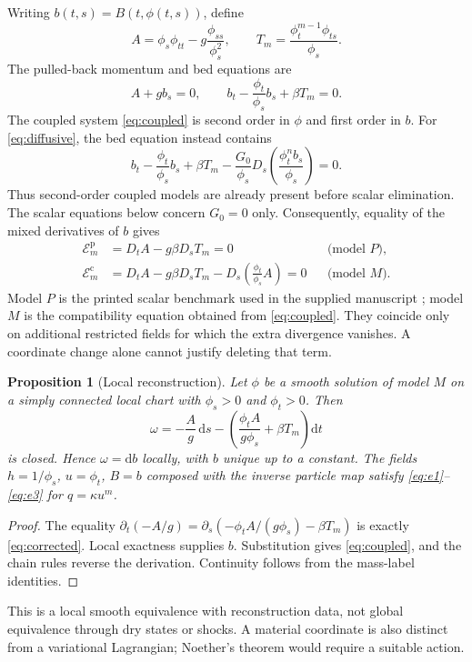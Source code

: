 \documentclass[11pt,a4paper,oneside]{report}
\numberwithin{equation}{chapter}
\newtheorem{proposition}[theorem]{Proposition}
\newcommand{\E}{\mathcal E}
\newcommand{\dd}{\mathrm d}
\begin{document}
Writing $b(t,s)=B(t,\phi(t,s))$, define
\begin{equation}
A=\phi_s\phi_{tt}-g\frac{\phi_{ss}}{\phi_s^2},\qquad
T_m=\frac{\phi_t^{m-1}\phi_{ts}}{\phi_s}.
\end{equation}
The pulled-back momentum and bed equations are
\begin{equation}\label{eq:coupled}
A+gb_s=0,\qquad b_t-\frac{\phi_t}{\phi_s}b_s+\beta T_m=0.
\end{equation}
The coupled system \eqref{eq:coupled} is second order in $\phi$ and first order in $b$. For \eqref{eq:diffusive}, the bed equation instead contains
\begin{equation}\label{eq:diffusive-material}
b_t-\frac{\phi_t}{\phi_s}b_s+\beta T_m
-\frac{G_0}{\phi_s}D_s\!\left(\frac{\phi_t^n b_s}{\phi_s}\right)=0.
\end{equation}
Thus second-order coupled models are already present before scalar elimination. The scalar equations below concern $G_0=0$ only.
Consequently, equality of the mixed derivatives of $b$ gives
\begin{align}
\E_m^{\mathrm p}&=D_tA-g\beta D_sT_m=0 &&\text{(model $P$)},\label{eq:printed}\\
\E_m^{\mathrm c}&=D_tA-g\beta D_sT_m-D_s\!\left(\frac{\phi_t}{\phi_s}A\right)=0 &&\text{(model $M$)}.\label{eq:corrected}
\end{align}
Model $P$ is the printed scalar benchmark used in the supplied manuscript \cite{projectdraft,ap}; model $M$ is the compatibility equation obtained from \eqref{eq:coupled}. They coincide only on additional restricted fields for which the extra divergence vanishes. A coordinate change alone cannot justify deleting that term.

\begin{proposition}[Local reconstruction]\label{prop:reconstruct}
Let $\phi$ be a smooth solution of model $M$ on a simply connected local chart with $\phi_s>0$ and $\phi_t>0$. Then
\begin{equation}\label{eq:bedform}
\omega=-\frac{A}{g}\,\dd s-
\left(\frac{\phi_tA}{g\phi_s}+\beta T_m\right)\dd t
\end{equation}
is closed. Hence $\omega=\dd b$ locally, with $b$ unique up to a constant. The fields $h=1/\phi_s$, $u=\phi_t$, $B=b$ composed with the inverse particle map satisfy \eqref{eq:e1}--\eqref{eq:e3} for $q=\kappa u^m$.
\end{proposition}
\begin{proof}
The equality $\partial_t(-A/g)=\partial_s(-\phi_tA/(g\phi_s)-\beta T_m)$ is exactly \eqref{eq:corrected}. Local exactness supplies $b$. Substitution gives \eqref{eq:coupled}, and the chain rules reverse the derivation. Continuity follows from the mass-label identities.\end{proof}
This is a local smooth equivalence with reconstruction data, not global equivalence through dry states or shocks. A material coordinate is also distinct from a variational Lagrangian; Noether's theorem would require a suitable action.
\end{document}
